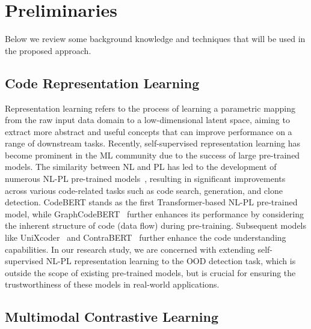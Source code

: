 \section{Preliminaries}
Below we review some background knowledge and techniques that will be used in the proposed approach.

\subsection{Code Representation Learning} 

Representation learning refers to the process of learning a parametric mapping from the raw input data domain to a low-dimensional latent space, aiming to extract more abstract and useful concepts that can improve performance on a range of downstream tasks. Recently, self-supervised representation learning has become prominent in the ML community due to the success of large pre-trained models. The similarity between NL and PL has led to the development of numerous NL-PL pre-trained models~\cite{guo2020graphcodebert, guo2022unixcoder}, resulting in significant improvements across various code-related tasks such as code search, generation, and clone detection. CodeBERT\cite{feng2020codebert} stands as the first Transformer-based NL-PL pre-trained model, while GraphCodeBERT~\cite{guo2020graphcodebert} further enhances its performance by considering the inherent structure of code (\ie data flow) during pre-training. Subsequent models like UniXcoder~\cite{guo2022unixcoder} and ContraBERT~\cite{liu2023contrabert} further enhance the code understanding capabilities. In our research study, we are concerned with extending self-supervised NL-PL representation learning to the OOD detection task, which is outside the scope of existing pre-trained models, but is crucial for ensuring the trustworthiness of these models in real-world applications. 

\subsection{Multimodal Contrastive Learning}

